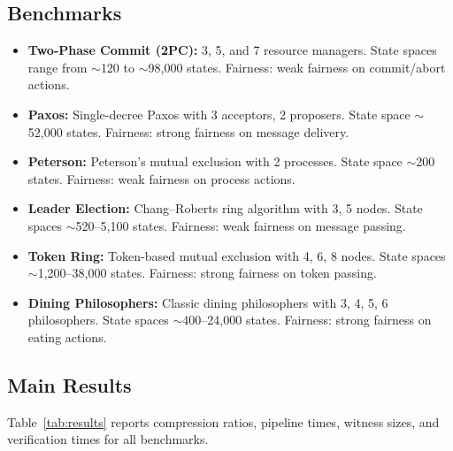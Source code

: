 \documentclass[11pt]{article}
\begin{document}
\subsection{Benchmarks}

\begin{itemize}[nosep]
\item \textbf{Two-Phase Commit (2PC):} 3, 5, and 7 resource managers.
  State spaces range from ${\sim}$120 to ${\sim}$98{,}000 states.
  Fairness: weak fairness on commit/abort actions.

\item \textbf{Paxos:} Single-decree Paxos with 3 acceptors, 2 proposers.
  State space ${\sim}$52{,}000 states.
  Fairness: strong fairness on message delivery.

\item \textbf{Peterson:} Peterson's mutual exclusion with 2 processes.
  State space ${\sim}$200 states.
  Fairness: weak fairness on process actions.

\item \textbf{Leader Election:} Chang--Roberts ring algorithm with 3, 5
  nodes.  State spaces ${\sim}$520--5{,}100 states.
  Fairness: weak fairness on message passing.

\item \textbf{Token Ring:} Token-based mutual exclusion with 4, 6, 8
  nodes.  State spaces ${\sim}$1{,}200--38{,}000 states.
  Fairness: strong fairness on token passing.

\item \textbf{Dining Philosophers:} Classic dining philosophers with 3, 4,
  5, 6 philosophers.  State spaces ${\sim}$400--24{,}000 states.
  Fairness: strong fairness on eating actions.
\end{itemize}

\subsection{Main Results}

Table~\ref{tab:results} reports compression ratios, pipeline times, witness
sizes, and verification times for all benchmarks.
\end{document}
